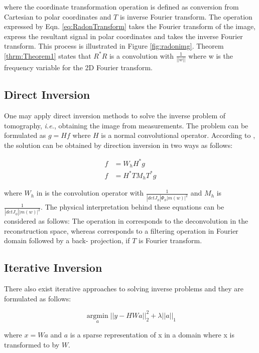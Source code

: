\documentclass[journal, onecolumn, 11pt]{IEEEtran}
\begin{document}
where the coordinate transformation operation is defined as conversion from Cartesian to polar coordinates and $T$ is inverse Fourier transform. The operation expressed by Eqn. \ref{eq:RadonTransform} takes the Fourier transform of the image, express the resultant signal in polar coordinates and takes the inverse Fourier transform. This process is illustrated in Figure \ref{fig:radonimg}. Theorem \ref{thrm:Theorem1} states that $R^\ast R$ is a convolution with $\frac{1}{||w||}$ where w is the frequency variable for the 2D Fourier transform. 

\subsection{Direct Inversion}

One may apply direct inversion methods to solve the inverse problem of tomography, \textit{i.e.}, obtaining the image from measurements. The problem can be formulated as $g=Hf$ where $H$ is a normal convolutional operator. According to \cite{FBPConvNet}, the solution can be obtained by direction inversion in two ways as follows: 

\begin{align}
    f &= W_h H^\ast g \label{eq:inv1}\\
    f &= H^\ast T M_h T^\ast g \label{eq:inv2}
\end{align}

where $W_h$ in  is the convolution operator with $\frac{1}{|det J_\phi|\Phi_\phi|m(w)|^2}$ and $M_h$ is $\frac{1}{|det J_\phi||m(w)|^2}$. The physical interpretation behind these equations can be considered as follows: The operation in  corresponds to the deconvolution in the reconstruction space, whereas  corresponds to a filtering operation in Fourier domain followed by a back- projection, if $T$ is Fourier transform. 

\subsection{Iterative Inversion}

There also exist iterative approaches to solving inverse problems and they are formulated as follows: 

\begin{equation}
    \operatorname*{argmin}_a ||y-HWa||_2^2 + \lambda ||a||_1 
\end{equation}

where $x = Wa$ and $a$ is a sparse representation of x in a domain where x is transformed to by $W$.
\end{document}

